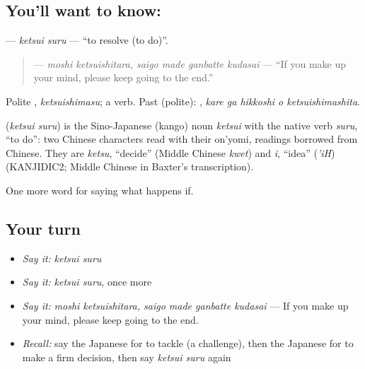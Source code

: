 \subsection*{You'll want to know: }
\textbf{} — \emph{ketsui suru} — \textquotedblleft{}to resolve (to do)\textquotedblright{}.

\begin{quote}
\textbf{   } — \emph{moshi ketsuishitara, saigo made ganbatte kudasai} — \textquotedblleft{}If you make up your mind, please keep going to the end.\textquotedblright{}
\end{quote}

Polite \textbf{}, \emph{ketsuishimasu}; a  verb. Past (polite): \textbf{  }, \emph{kare ga hikkoshi o ketsuishimashita}.

\begin{cousinweb}
\textbf{} (\emph{ketsui suru}) is the Sino-Japanese (kango) noun \emph{ketsui} with the native verb \emph{suru}, \textquotedblleft{}to do\textquotedblright{}: two Chinese characters read with their on'yomi, readings borrowed from Chinese. They are \emph{ketsu}, \textquotedblleft{}decide\textquotedblright{} (Middle Chinese \emph{kwet}) and \emph{i}, \textquotedblleft{}idea\textquotedblright{} (\emph{'iH}) (KANJIDIC2; Middle Chinese in Baxter's transcription).
\end{cousinweb}

\begin{grammarlens}[title={What you've built}]
One more word for saying what happens if.
\end{grammarlens}

\subsection*{Your turn}
\begin{itemize}
\raggedright
  \item \emph{Say it:} \emph{ketsui suru}
  \item \emph{Say it:} \emph{ketsui suru}, once more
  \item \emph{Say it:} \emph{moshi ketsuishitara, saigo made ganbatte kudasai} — If you make up your mind, please keep going to the end.
  \item \emph{Recall:} say the Japanese for to tackle (a challenge), then the Japanese for to make a firm decision, then say \emph{ketsui suru} again
\end{itemize}

